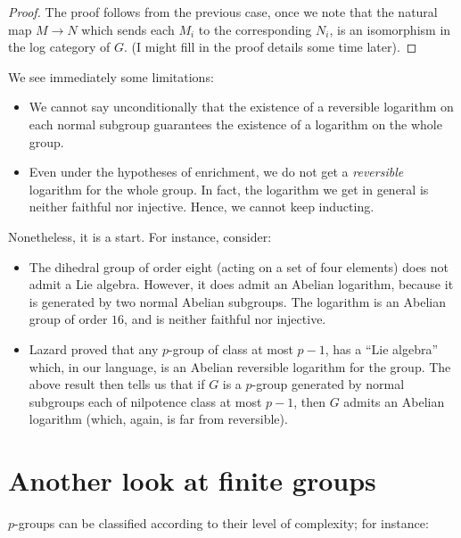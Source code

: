 \documentclass[a4paper]{amsart}
\begin{document}
\begin{proof}
  The proof follows from the previous case, once we note that the
  natural map $M \to N$ which sends each $M_i$ to the corresponding
  $N_i$, is an isomorphism in the log category of $G$. (I might fill
  in the proof details some time later).
\end{proof}

We see immediately some limitations:

\begin{itemize}

\item We cannot say unconditionally that the existence of a reversible
  logarithm on each normal subgroup guarantees the existence of a
  logarithm on the whole group.

\item Even under the hypotheses of enrichment, we do not get a {\em
    reversible} logarithm for the whole group. In fact, the logarithm
  we get in general is neither faithful nor injective. Hence, we
  cannot keep inducting.

\end{itemize}

Nonetheless, it is a start. For instance, consider:

\begin{itemize}

\item The dihedral group of order eight (acting on a set of four
  elements) does not admit a Lie algebra. However, it does admit an
  Abelian logarithm, because it is generated by two normal Abelian
  subgroups. The logarithm is an Abelian group of order $16$, and is
  neither faithful nor injective.

\item Lazard proved that any $p$-group of class at most $p-1$, has a
  ``Lie algebra'' which, in our language, is an Abelian reversible
  logarithm for the group. The above result then tells us that if $G$
  is a $p$-group generated by normal subgroups each of nilpotence
  class at most $p-1$, then $G$ admits an Abelian logarithm (which,
  again, is far from reversible).

\end{itemize}

\section{Another look at finite groups}

$p$-groups can be classified according to their level of complexity;
for instance:
\end{document}
